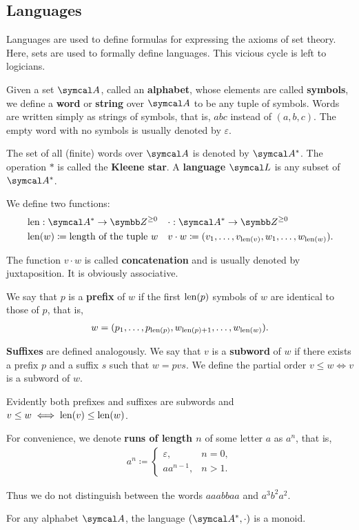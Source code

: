 \subsection{Languages}\label{subsec:languages}

Languages are used to define formulas for expressing the axioms of set theory. Here, sets are used to formally define languages. This vicious cycle is left to logicians.

\begin{definition}\label{def:language}
  Given a set \( \Cal{A} \), called an \textbf{alphabet}, whose elements are called \textbf{symbols}, we define a \textbf{word} or \textbf{string} over \( \Cal{A} \) to be any tuple of symbols. Words are written simply as strings of symbols, that is, \( abc \) instead of \( (a, b, c) \). The empty word with no symbols is usually denoted by \( \varepsilon \).

  The set of all (finite) words over \( \Cal{A} \) is denoted by \( \Cal{A}^{*} \). The operation \( * \) is called the \textbf{Kleene star}. A \textbf{language} \( \Cal{L} \) is any subset of \( \Cal{A}^{*} \).

  We define two functions:
  \begin{align*}
    &\Len: \Cal{A}^{*} \to \BB{Z}^{\geq 0}
    &&\cdot: \Cal{A}^{*} \to \BB{Z}^{\geq 0}
    \\
    &\Len(w) \coloneqq \text{length of the tuple } w
    &&v \cdot w \coloneqq (v_1, \ldots, v_{\Len(v)}, w_1, \ldots, w_{\Len(w)}).
  \end{align*}

  The function \( v \cdot w \) is called \textbf{concatenation} and is usually denoted by juxtaposition. It is obviously associative.

  We say that \( p \) is a \textbf{prefix} of \( w \) if the first \( \operatorname{len}(p) \) symbols of \( w \) are identical to those of \( p \), that is,
  \begin{align*}
    w = (p_1, \ldots, p_{\operatorname{len}(p)}, w_{\operatorname{len}(p) + 1}, \ldots, w_{\operatorname{len}(w)}).
  \end{align*}

  \textbf{Suffixes} are defined analogously. We say that \( v \) is a \textbf{subword} of \( w \) if there exists a prefix \( p \) and a suffix \( s \) such that \( w = pvs \). We define the partial order \( v \leq w \iff v \) is a subword of \( w \).

  Evidently both prefixes and suffixes are subwords and \( v \leq w \iff \operatorname{len}(v) \leq \operatorname{len}(w) \).

  For convenience, we denote \textbf{runs of length \( n \)} of some letter \( a \) as \( a^n \), that is,
  \begin{align*}
    a^n \coloneqq \begin{cases}
      \varepsilon, &n = 0, \\
      a a^{n-1}, &n > 1.
    \end{cases}
  \end{align*}

  Thus we do not distinguish between the words \( aaabbaa \) and \( a^3 b^2 a^2 \).
\end{definition}

\begin{proposition}\label{thm:set_of_all_words_is_monoid}
  For any alphabet \( \Cal{A} \), the language \( (\Cal{A}^{*}, \cdot) \) is a monoid.
\end{proposition}
